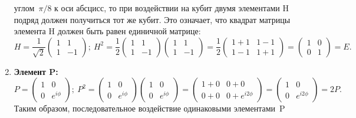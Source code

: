 \documentclass[pscyr,notitlepage]{hedwork}
\renewcommand{\~}[1]{\widetilde{#1}}
\begin{document}
\begin{enumerate}
      углом~\( \pi / 8 \) к оси абсцисс, то при воздействии на кубит двумя
      элементами H подряд должен получиться тот же кубит. Это означает, что
      квадрат матрицы элемента H должен быть равен единичной матрице:
      \[
        H = \frac{1}{\sqrt{2}}\!
        \begin{pmatrix}
          1 & 1 \\[-1.7ex] 1 & -1
        \end{pmatrix}\!\!;
        \
        H^2 \!= \frac{1}{2}\!\!
        \begin{pmatrix}
          1 & 1 \\[-1.7ex] 1 & -1
        \end{pmatrix}\!\!
        \begin{pmatrix}
          1 & 1 \\[-1.7ex] 1 & -1
        \end{pmatrix} \!=\! \frac{1}{2}\!\!
        \begin{pmatrix}
          1 + 1 & 1 - 1 \\[-1.7ex] 1 - 1 & 1 + 1
        \end{pmatrix} \!\!=\!\!
        \begin{pmatrix}
          1 & 0 \\[-1.7ex] 0 & 1
        \end{pmatrix}  \!\!=\! E.
      \]
    \item \textbf{Элемент P:}
      \[
        P =
        \begin{pmatrix}
          1 & 0 \\[-1.7ex] 0 & e^{i\phi}
        \end{pmatrix}\!\!;
        \
        P^2\! = 
        \begin{pmatrix}
          1 & 0 \\[-1.7ex] 0 & e^{i\phi}
        \end{pmatrix}\!\!
        \begin{pmatrix}
          1 & 0 \\[-1.7ex] 0 & e^{i\phi}
        \end{pmatrix} \!=\!
        \begin{pmatrix}
          1 + 0 & 0 + 0 \\[-1.7ex] 0 + 0 & 0 + e^{i2\phi}
        \end{pmatrix} \!=\!
        \begin{pmatrix}
          1 & 0 \\[-1.7ex] 0 & e^{i2\phi}
        \end{pmatrix}\!\! =\! 2P.
      \]
      Таким образом, последовательное воздействие одинаковыми элементами~P

\end{enumerate}
\end{document}
